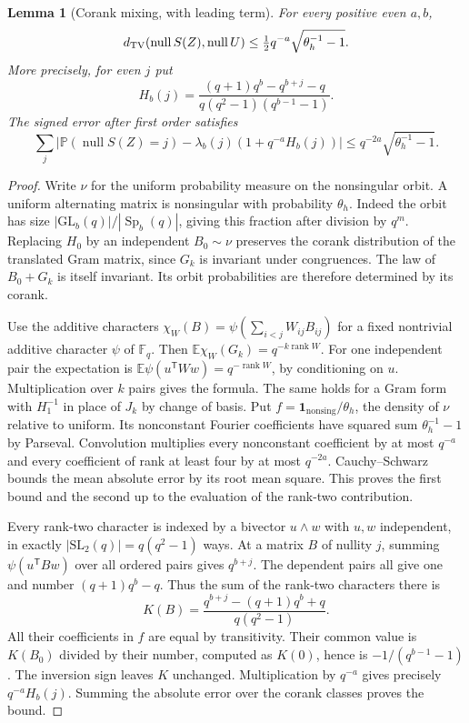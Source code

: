 \documentclass[11pt]{article}
\newtheorem{lemma}[theorem]{Lemma}
\newcommand{\F}{\mathbb F_q}
\newcommand{\Sp}{\operatorname{Sp}}
\newcommand{\TV}{d_{\rm TV}}
\newcommand{\rk}{\operatorname{rank}}
\newcommand{\nil}{\operatorname{null}}
\newcommand{\Prob}{\mathbb P}
\newcommand{\E}{\mathbb E}
\newcommand{\T}{\mathsf T}
\begin{document}
\begin{lemma}[Corank mixing, with leading term]\label{lem:mix}
For every positive even $a,b$,
\[
 \TV(\nil S(Z),\nil U)\le \tfrac12q^{-a}\sqrt{\theta_h^{-1}-1}.
\]
More precisely, for even $j$ put
\[
 H_b(j)=\frac{(q+1)q^b-q^{b+j}-q}{q(q^2-1)(q^{b-1}-1)}.
\]
The signed error after first order satisfies
\[
 \sum_j\left|\Prob(\nil S(Z)=j)-\lambda_b(j)(1+q^{-a}H_b(j))\right|
 \le q^{-2a}\sqrt{\theta_h^{-1}-1}.
\]
\end{lemma}
\begin{proof}
Write $\nu$ for the uniform probability measure on the nonsingular orbit. A uniform alternating matrix is nonsingular with probability $\theta_h$. Indeed the orbit has size $|\mathrm{GL}_b(q)|/|\Sp_b(q)|$, giving this fraction after division by $q^m$. Replacing $H_0$ by an independent $B_0\sim\nu$ preserves the corank distribution of the translated Gram matrix, since $G_k$ is invariant under congruences. The law of $B_0+G_k$ is itself invariant. Its orbit probabilities are therefore determined by its corank.

Use the additive characters $\chi_W(B)=\psi(\sum_{i<j}W_{ij}B_{ij})$ for a fixed nontrivial additive character $\psi$ of $\F$. Then $\E\chi_W(G_k)=q^{-k\rk W}$. For one independent pair the expectation is $\E\psi(u^\T Ww)=q^{-\rk W}$, by conditioning on $u$. Multiplication over $k$ pairs gives the formula. The same holds for a Gram form with $H_1^{-1}$ in place of $J_k$ by change of basis. Put $f=\mathbf1_{\mathrm{nonsing}}/\theta_h$, the density of $\nu$ relative to uniform. Its nonconstant Fourier coefficients have squared sum $\theta_h^{-1}-1$ by Parseval. Convolution multiplies every nonconstant coefficient by at most $q^{-a}$ and every coefficient of rank at least four by at most $q^{-2a}$. Cauchy--Schwarz bounds the mean absolute error by its root mean square. This proves the first bound and the second up to the evaluation of the rank-two contribution.

Every rank-two character is indexed by a bivector $u\wedge w$ with $u,w$ independent, in exactly $|\mathrm{SL}_2(q)|=q(q^2-1)$ ways. At a matrix $B$ of nullity $j$, summing $\psi(u^\T Bw)$ over all ordered pairs gives $q^{b+j}$. The dependent pairs all give one and number $(q+1)q^b-q$. Thus the sum of the rank-two characters there is
\[
 K(B)=\frac{q^{b+j}-(q+1)q^b+q}{q(q^2-1)}.
\]
All their coefficients in $f$ are equal by transitivity. Their common value is $K(B_0)$ divided by their number, computed as $K(0)$, hence is $-1/(q^{b-1}-1)$. The inversion sign leaves $K$ unchanged. Multiplication by $q^{-a}$ gives precisely $q^{-a}H_b(j)$. Summing the absolute error over the corank classes proves the bound.
\end{proof}
\end{document}
